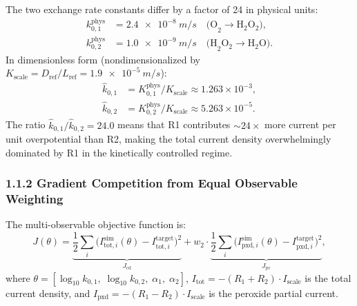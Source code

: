\documentclass[11pt]{article}
\begin{document}
The two exchange rate constants differ by a factor of 24 in physical units:
\begin{align}
  k_{0,1}^{\text{phys}} &= \SI{2.4e-8}{m/s} \quad\text{(O}_2 \to \text{H}_2\text{O}_2\text{)}, \\
  k_{0,2}^{\text{phys}} &= \SI{1.0e-9}{m/s} \quad\text{(H}_2\text{O}_2 \to \text{H}_2\text{O}\text{)}.
\end{align}
In dimensionless form (nondimensionalized by $K_{\text{scale}} = D_{\text{ref}} / L_{\text{ref}}
= \SI{1.9e-5}{m/s}$):
\begin{align}
  \hat{k}_{0,1} &= K_{0,1}^{\text{phys}} / K_{\text{scale}} \approx 1.263 \times 10^{-3}, \\
  \hat{k}_{0,2} &= K_{0,2}^{\text{phys}} / K_{\text{scale}} \approx 5.263 \times 10^{-5}.
\end{align}
The ratio $\hat{k}_{0,1} / \hat{k}_{0,2} = 24.0$ means that R1 contributes
${\sim}24\times$ more current per unit overpotential than R2, making the total
current density overwhelmingly dominated by R1 in the kinetically controlled
regime.

\subsubsection*{1.1.2 Gradient Competition from Equal Observable Weighting}

The multi-observable objective function is:
\begin{equation}\label{eq:objective}
  J(\theta) = \underbrace{\frac{1}{2} \sum_{i} \bigl(I_{\text{tot},i}^{\text{sim}}(\theta) - I_{\text{tot},i}^{\text{target}}\bigr)^2}_{J_{\text{cd}}} +
  w_2 \cdot \underbrace{\frac{1}{2} \sum_{i} \bigl(I_{\text{pxd},i}^{\text{sim}}(\theta) - I_{\text{pxd},i}^{\text{target}}\bigr)^2}_{J_{\text{pc}}},
\end{equation}
where $\theta = [\log_{10} k_{0,1},\; \log_{10} k_{0,2},\; \alpha_1,\; \alpha_2]$,
$I_{\text{tot}} = -(R_1 + R_2) \cdot I_{\text{scale}}$ is the total current density,
and $I_{\text{pxd}} = -(R_1 - R_2) \cdot I_{\text{scale}}$ is the peroxide partial current.
\end{document}
